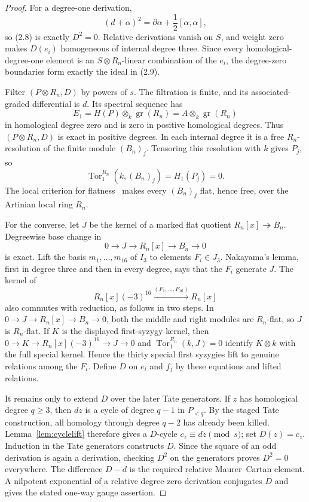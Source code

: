 \documentclass[11pt]{article}
\theoremstyle{definition}
\theoremstyle{remark}
\newcommand{\gr}{\operatorname{gr}}
\newcommand{\Tor}{\operatorname{Tor}}
\begin{document}
\begin{proof}
For a degree-one derivation,
\[
 (d+\alpha)^2=\partial\alpha+\frac12[\alpha,\alpha],
\]
so (2.8) is exactly $D^2=0$.  Relative derivations vanish on $S$, and weight
zero makes $D(e_i)$ homogeneous of internal degree three.  Since every
homological-degree-one element is an $S\otimes R_n$-linear combination of
the $e_i$, the degree-zero boundaries form exactly the ideal in (2.9).

Filter $(P\otimes R_n,D)$ by powers of $s$.  The filtration is finite, and
its associated-graded differential is $d$.  Its spectral sequence has
\[
 E_1=H(P)\otimes_k\gr(R_n)
     =A\otimes_k\gr(R_n)
\]
in homological degree zero and is zero in positive homological degrees.
Thus $(P\otimes R_n,D)$ is exact in positive degrees.  In each internal
degree it is a free $R_n$-resolution of the finite module $(B_n)_j$.
Tensoring this resolution with $k$ gives $P_j$, so
\[
 \Tor^{R_n}_1(k,(B_n)_j)=H_1(P_j)=0.
\]
The local criterion for flatness~\cite[Tag 00MK]{StacksFlat} makes every
$(B_n)_j$ flat, hence free, over the Artinian local ring $R_n$.

For the converse, let $J$ be the kernel of a marked flat quotient
$R_n[x]\twoheadrightarrow B_n$.  Degreewise base change in
\[
 0\longrightarrow J\longrightarrow R_n[x]\longrightarrow B_n
 \longrightarrow0
\]
is exact.  Lift the basis $m_1,\ldots,m_{16}$ of $I_3$ to elements
$F_i\in J_3$.  Nakayama's lemma, first in degree three and then in every
degree, says that the $F_i$ generate $J$.  The kernel of
\[
 R_n[x](-3)^{16}\xrightarrow{(F_1,\ldots,F_{16})}R_n[x]
\]
also commutes with reduction, as follows in two steps.  In
$0\to J\to R_n[x]\to B_n\to0$, both the middle and right modules are
$R_n$-flat, so $J$ is $R_n$-flat.  If $K$ is the displayed first-syzygy
kernel, then
$0\to K\to R_n[x](-3)^{16}\to J\to0$ and
$\Tor^{R_n}_1(k,J)=0$ identify $K\otimes k$ with the full special kernel.
Hence the
thirty special first syzygies lift to genuine relations among the $F_i$.
Define $D$ on $e_i$ and $f_j$ by these equations and lifted relations.

It remains only to extend $D$ over the later Tate generators.  If $z$ has
homological degree $q\geq3$, then $dz$ is a cycle of degree $q-1$ in
$P_{<q}$.  By the staged Tate construction, all homology through degree
$q-2$ has already been killed.  Lemma~\ref{lem:cyclelift} therefore gives a
$D$-cycle $c_z\equiv dz\pmod s$; set $D(z)=c_z$.  Induction in the Tate
generators constructs $D$.  Since the square of an odd derivation is again a
derivation, checking $D^2$ on the generators proves $D^2=0$ everywhere.  The
difference $D-d$ is the required relative Maurer--Cartan element.  A
nilpotent exponential of a relative degree-zero derivation conjugates $D$ and
gives the stated one-way gauge assertion.
\end{proof}
\end{document}
